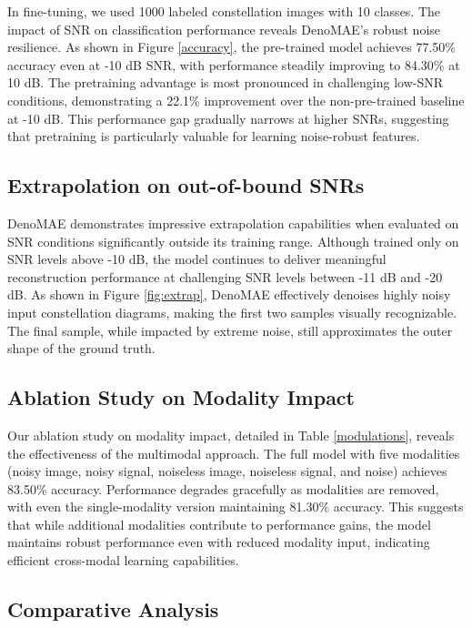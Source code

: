 In fine-tuning, we used 1000 labeled constellation images with 10 classes. The impact of SNR on classification performance reveals DenoMAE's robust noise resilience. As shown in Figure \ref{accuracy}, the pre-trained model achieves 77.50\% accuracy even at -10 dB SNR, with performance steadily improving to 84.30\% at 10 dB. The pretraining advantage is most pronounced in challenging low-SNR conditions, demonstrating a 22.1\% improvement over the non-pre-trained baseline at -10 dB. This performance gap gradually narrows at higher SNRs, suggesting that pretraining is particularly valuable for learning noise-robust features.


\subsection{Extrapolation on out-of-bound SNRs}

DenoMAE demonstrates impressive extrapolation capabilities when evaluated on SNR conditions significantly outside its training range. Although trained only on SNR levels above -10 dB, the model continues to deliver meaningful reconstruction performance at challenging SNR levels between -11 dB and -20 dB. As shown in Figure \ref{fig:extrap}, DenoMAE effectively denoises highly noisy input constellation diagrams, making the first two samples visually recognizable. The final sample, while impacted by extreme noise, still approximates the outer shape of the ground truth.

\subsection{Ablation Study on Modality Impact}

Our ablation study on modality impact, detailed in Table \ref{modulations}, reveals the effectiveness of the multimodal approach. The full model with five modalities (noisy image, noisy signal, noiseless image, noiseless signal, and noise) achieves 83.50\% accuracy. Performance degrades gracefully as modalities are removed, with even the single-modality version maintaining 81.30\% accuracy. This suggests that while additional modalities contribute to performance gains, the model maintains robust performance even with reduced modality input, indicating efficient cross-modal learning capabilities.

\subsection{Comparative Analysis}

